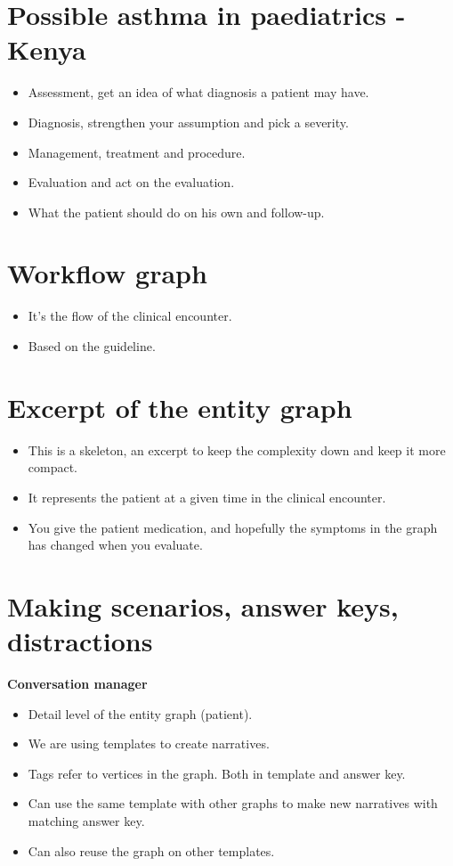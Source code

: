 \documentclass[20pt]{extarticle}
\begin{document}
	\section{Possible asthma in paediatrics - Kenya}
	\begin{itemize}
		\item Assessment, get an idea of what diagnosis a patient may have.
		\item Diagnosis, strengthen your assumption and pick a severity.
		\item Management, treatment and procedure.
		\item Evaluation and act on the evaluation.
		\item What the patient should do on his own and follow-up.
	\end{itemize}
	
	\section{Workflow graph}
	\begin{itemize}
		\item It's the flow of the clinical encounter.
		\item Based on the guideline.
	\end{itemize}

	\section{Excerpt of the entity graph}
	\begin{itemize}
		\item This is a skeleton, an excerpt to keep the complexity down and keep it more compact.
		\item It represents the patient at a given time in the clinical encounter.
		\item You give the patient medication, and hopefully the symptoms in the graph has changed when you evaluate.
	\end{itemize}

	\section{Making scenarios, answer keys, distractions}
	\textbf{Conversation manager}
	\begin{itemize}
		\item Detail level of the entity graph (patient).
		\item We are using templates to create narratives.
		\item Tags refer to vertices in the graph. Both in template and answer key.
		\item Can use the same template with other graphs to make new narratives with matching answer key.
		\item Can also reuse the graph on other templates.
	\end{itemize}
\end{document}
